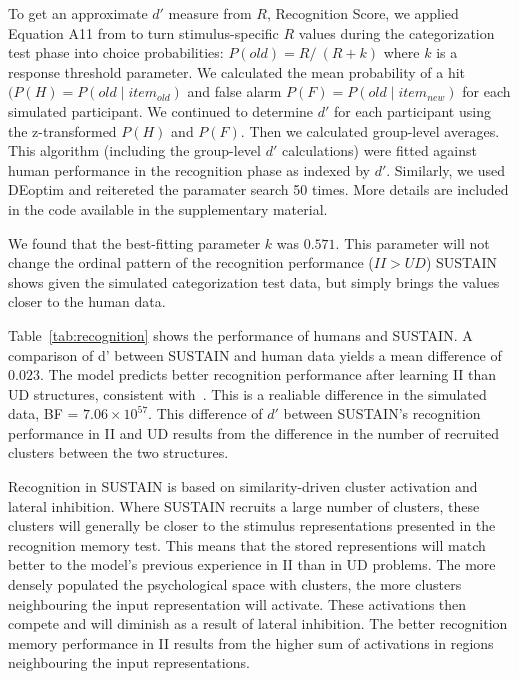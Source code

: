 \documentclass[10pt,letterpaper]{article}
\begin{document}


To get an approximate $d'$ measure from $R$, Recognition Score, we applied
Equation A11 from  to turn stimulus-specific $R$ values
during the categorization test phase into choice probabilities: $P(old) = R /\ (R + k)$
where $k$ is a response threshold parameter. We calculated the mean probability
of a hit $(P(H) = P(old \mid item_{old})$ and false alarm $P(F) = P(old \mid
item_{new})$ for each simulated participant. We continued to
determine $d'$ for each participant using the z-transformed $P(H)$ and $P(F)$.
Then we calculated group-level averages. This algorithm (including
the group-level $d'$ calculations) were fitted against human performance
in the recognition phase as indexed by $d'$. Similarly, we used DEoptim and
reitereted the paramater search 50 times. More details are included in the code
available in the supplementary material.

We found that the best-fitting parameter $k$
was $0.571$. This parameter will not change the ordinal pattern of the
recognition performance ($II > UD$) SUSTAIN shows given the simulated
categorization test data, but simply brings the values closer to the human data.

Table~\ref{tab:recognition} shows the performance of humans and SUSTAIN.
A comparison of d' between SUSTAIN and human data yields a mean difference of
$0.023$. The model predicts better recognition performance after learning II
than UD structures, consistent with~.
This is a realiable difference in the simulated data, BF = $7.06 \times 10^{57}$.
This difference of $d'$ between SUSTAIN's recognition performance in II and UD
results from the difference in the number of recruited clusters between the
two structures.

Recognition in SUSTAIN is based on similarity-driven cluster activation and
lateral inhibition. Where SUSTAIN recruits a large number of clusters, these
clusters will generally be closer to the stimulus representations presented
in the recognition memory test. This means that the stored
representions will match better to the model's previous experience in II than in
UD problems. The more densely populated the psychological space with clusters,
the more clusters neighbouring the input representation will activate. These
activations then compete and will diminish as a result of
lateral inhibition. The better recognition memory performance in II results
from the higher sum of activations in regions neighbouring the input representations.
\end{document}
